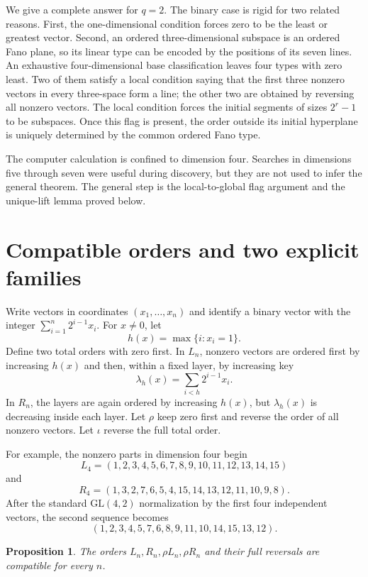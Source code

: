 \documentclass[11pt]{article}
\newtheorem{proposition}[theorem]{Proposition}
\begin{document}
We give a complete answer for $q=2$. The binary case is rigid for two related
reasons. First, the one-dimensional condition forces zero to be the least or
greatest vector. Second, an ordered three-dimensional subspace is an ordered
Fano plane, so its linear type can be encoded by the positions of its seven
lines. An exhaustive four-dimensional base classification leaves four types
with zero least. Two of them satisfy a local condition saying that the first
three nonzero vectors in every three-space form a line; the other two are
obtained by reversing all nonzero vectors. The local condition forces the
initial segments of sizes $2^r-1$ to be subspaces. Once this flag is present,
the order outside its initial hyperplane is uniquely determined by the common
ordered Fano type.

The computer calculation is confined to dimension four. Searches in
dimensions five through seven were useful during discovery, but they are not
used to infer the general theorem. The general step is the local-to-global
flag argument and the unique-lift lemma proved below.

\section{Compatible orders and two explicit families}

Write vectors in coordinates $(x_1,\ldots,x_n)$ and identify a binary vector
with the integer $\sum_{i=1}^n2^{i-1}x_i$. For $x\ne0$, let
\[
h(x)=\max\{i:x_i=1\}.
\]
Define two total orders with zero first. In $L_n$, nonzero vectors are ordered
first by increasing $h(x)$ and then, within a fixed layer, by increasing key
\[
\lambda_h(x)=\sum_{i<h}2^{i-1}x_i.
\]
In $R_n$, the layers are again ordered by increasing $h(x)$, but
$\lambda_h(x)$ is decreasing inside each layer. Let $\rho$ keep zero first
and reverse the order of all nonzero vectors. Let $\iota$ reverse the full
total order.

For example, the nonzero parts in dimension four begin
\[
L_4=(1,2,3,4,5,6,7,8,9,10,11,12,13,14,15)
\]
and
\[
R_4=(1,3,2,7,6,5,4,15,14,13,12,11,10,9,8).
\]
After the standard $\mathrm{GL}(4,2)$ normalization by the first four
independent vectors, the second sequence becomes
\[
(1,2,3,4,5,7,6,8,9,11,10,14,15,13,12).
\]

\begin{proposition}\label{prop:explicit}
The orders $L_n,R_n,\rho L_n,\rho R_n$ and their full reversals are compatible
for every $n$.
\end{proposition}
\end{document}
